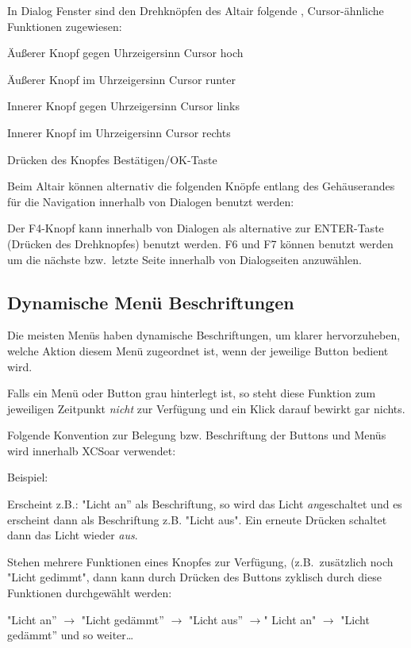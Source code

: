 
In Dialog Fenster sind den Drehknöpfen des \textsf{Altair} folgende , Cursor-ähnliche Funktionen zugewiesen:
\begin{jspecs}
\item[Äußerer Knopf gegen Uhrzeigersinn       ] Cursor hoch
\item[Äußerer Knopf im Uhrzeigersinn             ] Cursor runter
\item[Innerer Knopf gegen Uhrzeigersinn        ] Cursor links
\item[Innerer Knopf im Uhrzeigersinn              ] Cursor rechts
\item[Drücken des Knopfes ] Bestätigen/OK-Taste
\end{jspecs}

Beim \textsf{Altair} können alternativ die folgenden Knöpfe entlang des Gehäuserandes für die Navigation innerhalb von Dialogen benutzt werden:

Der F4-Knopf kann innerhalb von Dialogen als alternative zur ENTER-Taste (Drücken des Drehknopfes) benutzt werden.
F6 und F7 können benutzt werden um die nächste bzw.\ letzte Seite innerhalb von Dialogseiten anzuwählen.
\subsection*{Dynamische Menü Beschriftungen}
Die meisten Menüs haben dynamische Beschriftungen, um klarer hervorzuheben, welche Aktion diesem Menü zugeordnet ist, wenn der jeweilige Button bedient wird.

Falls ein Menü oder Button grau hinterlegt ist, so steht diese Funktion zum jeweiligen Zeitpunkt \emph{nicht} zur Verfügung und ein Klick darauf bewirkt gar nichts.

Folgende Konvention zur Belegung bzw. Beschriftung der Buttons und Menüs wird  innerhalb \textsf{XCSoar} verwendet:

Beispiel:

Erscheint z.B.:  "Licht an'' als Beschriftung, so  wird das Licht \emph{an}geschaltet und  es erscheint dann als Beschriftung z.B. "Licht aus".  Ein erneute Drücken schaltet dann das Licht wieder \emph{aus}.

Stehen mehrere Funktionen eines Knopfes zur Verfügung, (z.B.\ zusätzlich noch "Licht gedimmt", dann kann durch Drücken des Buttons zyklisch durch diese Funktionen durchgewählt werden:


\begin{center}
"Licht an'' $\rightarrow$ "Licht gedämmt'' $\rightarrow$ "Licht aus'' $\rightarrow$" Licht an" $\rightarrow$ "Licht gedämmt'' und so weiter\dots
\end{center}


